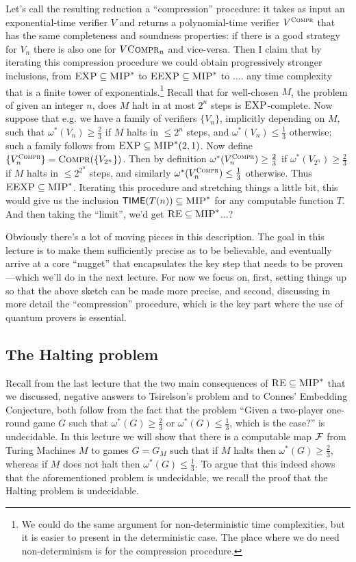 Let's call the resulting reduction a ``compression'' procedure: it takes as input an exponential-time  verifier $V$ and returns a polynomial-time verifier $V^{\textsc{Compr}}$ that has the same completeness and soundness properties: if there is a good strategy for $V_n$ there is also one for $V\textsc{Compr}_n$ and vice-versa. Then I claim that by iterating this compression procedure we could obtain progressively stronger inclusions, from $\textsc{EXP} \subseteq \textsc{MIP}^*$ to $\textsc{EEXP}\subseteq \textsc{MIP}^*$ to .... any time complexity that is a finite tower of exponentials.\footnote{We could do the same argument for non-deterministic time complexities, but it is easier to present in the deterministic case. The place where we do need non-determinism is for the compression procedure.}
Recall that for well-chosen $M$, the problem of given an integer $n$, does $M$ halt in at most $2^n$ steps is $\textsc{EXP}$-complete. Now suppose that e.g. we have a family of verifiers $\{V_n\}$, implicitly depending on $M$, such that $\omega^*(V_n) \geq \frac{2}{3}$ if $M$ halts in $\leq 2^n$ steps, and $\omega^*(V_n) \leq \frac{1}{3}$ otherwise; such a family follows from $\textsc{EXP} \subseteq \textsc{MIP}^*(2,1)$. Now define $\{V^{\textsc{Compr}}_n\} = \textsc{Compr}(\{V_{2^n}\})$. Then by definition   $\omega^*(V^{\textsc{Compr}}_n) \geq \frac{2}{3}$ if $\omega^*(V_{2^n}) \geq \frac{2}{3}$ if $M$ halts in $\leq 2^{2^n}$ steps, and similarly $\omega^*(V^{\textsc{Compr}}_n) \leq \frac{1}{3}$ otherwise. Thus $\textsc{EEXP}\subseteq \textsc{MIP}^*$. Iterating this procedure and stretching things a little bit, this would give us the inclusion $\mathsf{TIME}(T(n))\subseteq \textsc{MIP}^*$ for any computable function $T$. And then taking the ``limit'', we'd get $\textsc{RE}\subseteq \textsc{MIP}^*$...?

Obviously there's a lot of moving pieces in this description. The goal in this lecture is to make them sufficiently precise as to be believable, and eventually arrive at a core ``nugget'' that encapsulates the key step that needs to be proven---which we'll do in the next lecture. For now we focus on, first, setting things up so that the above sketch can be made more precise, and second, discussing in more detail the ``compression'' procedure, which is the key part where the use of quantum provers is essential. 


\subsection{The Halting problem}

Recall from the last lecture that the two main consequences of $\textsc{RE}\subseteq\textsc{MIP}^*$ that we discussed, negative answers to Tsirelson's problem and to Connes' Embedding Conjecture, both follow from the fact that the problem ``Given a two-player one-round game $G$ such that $\omega^*(G) \geq \frac{2}{3}$ or $\omega^*(G) \leq \frac{1}{3}$, which is the case?'' is undecidable. In this lecture we will show that there is a computable map $\mathcal{F}$ from Turing Machines $M$ to games $G=G_M$ such that if $M$ halts then $\omega^*(G)\geq \frac{2}{3}$, whereas if $M$ does not halt then $\omega^*(G) \leq \frac{1}{3}$. To argue that this indeed shows that the aforementioned problem is undecidable, we recall the proof that the Halting problem is undecidable. 

